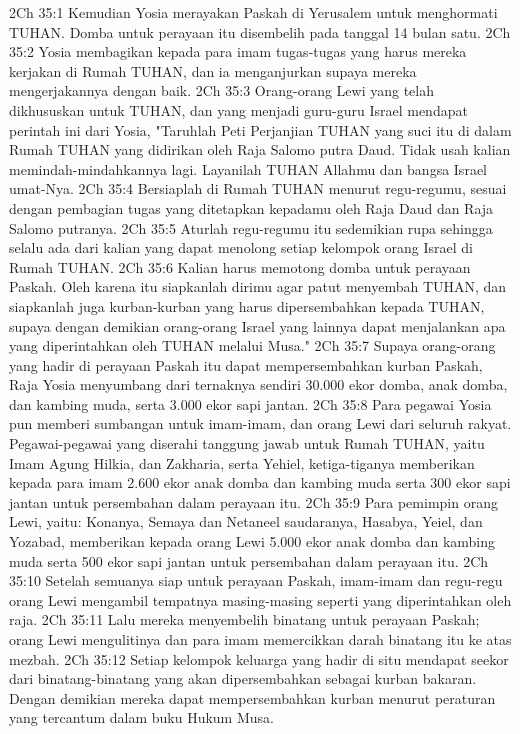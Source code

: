 2Ch 35:1  Kemudian Yosia merayakan Paskah di Yerusalem untuk menghormati TUHAN. Domba untuk perayaan itu disembelih pada tanggal 14 bulan satu.
2Ch 35:2  Yosia membagikan kepada para imam tugas-tugas yang harus mereka kerjakan di Rumah TUHAN, dan ia menganjurkan supaya mereka mengerjakannya dengan baik.
2Ch 35:3  Orang-orang Lewi yang telah dikhususkan untuk TUHAN, dan yang menjadi guru-guru Israel mendapat perintah ini dari Yosia, "Taruhlah Peti Perjanjian TUHAN yang suci itu di dalam Rumah TUHAN yang didirikan oleh Raja Salomo putra Daud. Tidak usah kalian memindah-mindahkannya lagi. Layanilah TUHAN Allahmu dan bangsa Israel umat-Nya.
2Ch 35:4  Bersiaplah di Rumah TUHAN menurut regu-regumu, sesuai dengan pembagian tugas yang ditetapkan kepadamu oleh Raja Daud dan Raja Salomo putranya.
2Ch 35:5  Aturlah regu-regumu itu sedemikian rupa sehingga selalu ada dari kalian yang dapat menolong setiap kelompok orang Israel di Rumah TUHAN.
2Ch 35:6  Kalian harus memotong domba untuk perayaan Paskah. Oleh karena itu siapkanlah dirimu agar patut menyembah TUHAN, dan siapkanlah juga kurban-kurban yang harus dipersembahkan kepada TUHAN, supaya dengan demikian orang-orang Israel yang lainnya dapat menjalankan apa yang diperintahkan oleh TUHAN melalui Musa."
2Ch 35:7  Supaya orang-orang yang hadir di perayaan Paskah itu dapat mempersembahkan kurban Paskah, Raja Yosia menyumbang dari ternaknya sendiri 30.000 ekor domba, anak domba, dan kambing muda, serta 3.000 ekor sapi jantan.
2Ch 35:8  Para pegawai Yosia pun memberi sumbangan untuk imam-imam, dan orang Lewi dari seluruh rakyat. Pegawai-pegawai yang diserahi tanggung jawab untuk Rumah TUHAN, yaitu Imam Agung Hilkia, dan Zakharia, serta Yehiel, ketiga-tiganya memberikan kepada para imam 2.600 ekor anak domba dan kambing muda serta 300 ekor sapi jantan untuk persembahan dalam perayaan itu.
2Ch 35:9  Para pemimpin orang Lewi, yaitu: Konanya, Semaya dan Netaneel saudaranya, Hasabya, Yeiel, dan Yozabad, memberikan kepada orang Lewi 5.000 ekor anak domba dan kambing muda serta 500 ekor sapi jantan untuk persembahan dalam perayaan itu.
2Ch 35:10  Setelah semuanya siap untuk perayaan Paskah, imam-imam dan regu-regu orang Lewi mengambil tempatnya masing-masing seperti yang diperintahkan oleh raja.
2Ch 35:11  Lalu mereka menyembelih binatang untuk perayaan Paskah; orang Lewi mengulitinya dan para imam memercikkan darah binatang itu ke atas mezbah.
2Ch 35:12  Setiap kelompok keluarga yang hadir di situ mendapat seekor dari binatang-binatang yang akan dipersembahkan sebagai kurban bakaran. Dengan demikian mereka dapat mempersembahkan kurban menurut peraturan yang tercantum dalam buku Hukum Musa.
